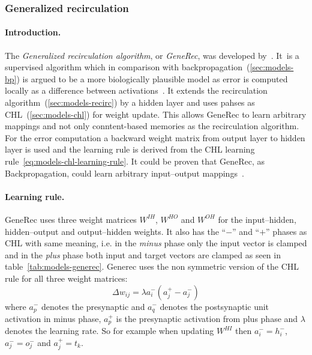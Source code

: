 \subsubsection{Generalized recirculation}
\label{sec:models-generec} 

\paragraph{Introduction.} 
The \emph{Generalized recirculation algorithm}, or \emph{GeneRec}, was developed by~\citet{o1996bio}. It~is a supervised algorithm which in comparison with backpropagation~(\ref{sec:models-bp}) is argued to be a more biologically plausible model as error is computed locally as a difference between activations~\citep{o1998six, o2001generalization, da2011advances, schneider2009application}. It extends the recirculation algorithm~(\ref{sec:models-recirc}) by a hidden layer and uses pahses as CHL~(\ref{sec:models-chl}) for weight update. This allows GeneRec to learn arbitrary mappings and not only conntent-based memories as the recirculation algorithm. For the error computation a backward weight matrix from output layer to hidden layer is used and the learning rule is derived from the CHL learning rule~\ref{eq:models-chl-learning-rule}. It could be proven that GeneRec, as Backpropagation, could learn arbitrary input--output mappings~\citep{o1996bio}. 

\paragraph{Learning rule.} 
\label{sec:models-generec-learning-rule} 
GeneRec uses three weight matrices $W^{IH}$, $W^{HO}$ and $W^{OH}$ for the input--hidden, hidden--output and output--hidden weights. It also has the ``$-$'' and ``$+$'' phases as CHL with same meaning, i.e. in the \emph{minus} phase only the input vector is clamped and in the \emph{plus} phase both input and target vectors are clamped as seen in table~\ref{tab:models-generec}. Generec uses the non symmetric version of the CHL rule for all three weight matrices: 
\begin{equation}
  \label{eq:models-generec-learning-rule}
  \Delta w_{ij} = \lambda a^{-}_i(a^{+}_j - a^{-}_j)
\end{equation}
where $a^{-}_p$ denotes the presynaptic and $a^{-}_q$ denotes the postsynaptic unit activation in minus phase, $a^{+}_p$ is the presynaptic activation from plus phase and $\lambda$ denotes the learning rate. So for example when updating $W^{HI}$ then $a^{-}_i = h^{-}_i$, $a^{-}_j = o^{-}_j$ and $a^{+}_j = t_k$. 

